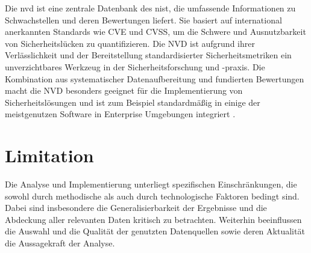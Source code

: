 \par Die \gls{nvd} ist eine zentrale Datenbank des \gls{nist}, die umfassende Informationen zu Schwachstellen und deren Bewertungen liefert. Sie basiert auf international anerkannten Standards wie CVE und CVSS, um die Schwere und Ausnutzbarkeit von Sicherheitslücken zu quantifizieren. Die NVD ist aufgrund ihrer Verlässlichkeit  und der Bereitstellung standardisierter Sicherheitsmetriken ein unverzichtbares Werkzeug in der Sicherheitsforschung und -praxis. Die Kombination aus systematischer Datenaufbereitung und fundierten Bewertungen macht die NVD besonders geeignet für die Implementierung von Sicherheitslösungen und ist zum Beispiel standardmäßig in einige der meistgenutzen Software in Enterprise Umgebungen integriert \autocite{AssetsNVDIntegration} \autocite{InformationenNVDIntegrationen}.

\section{Limitation}
\label{sec:limitationen}
Die Analyse und Implementierung unterliegt spezifischen Einschränkungen, die sowohl durch methodische als auch durch technologische Faktoren bedingt sind. Dabei sind insbesondere die Generalisierbarkeit der Ergebnisse und die Abdeckung aller relevanten Daten kritisch zu betrachten. Weiterhin beeinflussen die Auswahl und die Qualität der genutzten Datenquellen sowie deren Aktualität die Aussagekraft der Analyse. 
